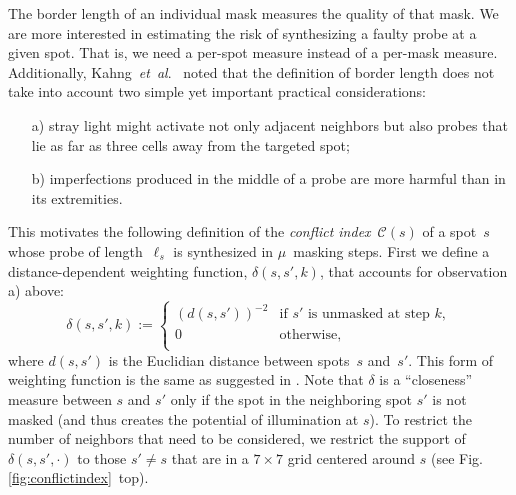 \documentclass{llncs}
\begin{document}
The border length of an individual mask measures the quality of that
mask. We are more interested in estimating the risk of synthesizing a faulty
probe at a given spot. That is, we need a per-spot measure
instead of a per-mask measure. Additionally, Kahng~{\it et~al}.~\cite{KAHNG03A} noted
that the definition of border length does not take into account two
simple yet important practical considerations:
\begin{itemize}
\item[a)] stray light might activate not only adjacent neighbors but
  also probes that lie as far as three cells away from the targeted
  spot;
\item[b)] imperfections produced in the middle of a probe are more
  harmful than in its extremities.
\end{itemize}
This motivates the following definition of the \emph{conflict
  index}~$\mathcal{C}(s)$ of a spot~$s$ whose probe of
length~$\ell_{s}$ is synthesized in $\mu$~masking steps. First we
define a distance-dependent weighting function, $\delta(s,s',k)$, that
accounts for observation a) above:
\begin{equation}
\label{eq:dist_weight}
\delta(s,s',k) :=
        \left\{
                \begin{array}{ll}
                        (d(s,s'))^{-2} & \mbox{if $s'$ is unmasked at step $k$}, \\
                        0 & \mbox{otherwise}, \\
                \end{array}
        \right.
\end{equation}
where $d(s,s')$ is the Euclidian distance between spots~$s$ and~$s'$.
This form of weighting function is the same as suggested in
\cite{KAHNG03A}.  Note that $\delta$ is a ``closeness'' measure
between $s$ and $s'$ only if the spot in the neighboring spot $s'$ is
not masked (and thus creates the potential of illumination at $s$). To
restrict the number of neighbors that need to be considered, we
restrict the support of $\delta(s,s',\cdot)$ to those $s'\neq s$ that
are in a $7\times 7$ grid centered around $s$ (see
Fig.\,\ref{fig:conflictindex}~top).
\end{document}
